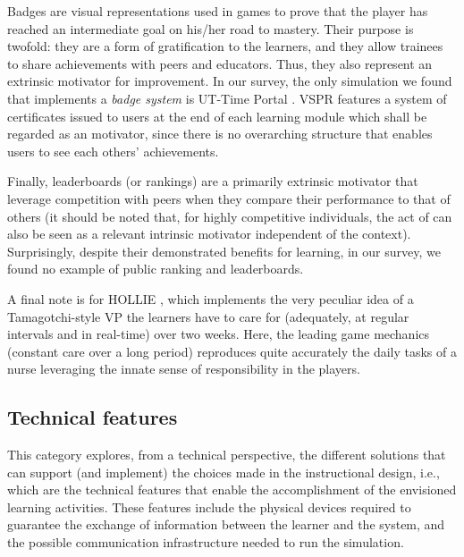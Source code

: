 Badges are visual representations used in games to prove that the player has reached an intermediate goal on his/her road to mastery. Their purpose is twofold: they are a form of gratification to the learners, and they allow trainees to share achievements with peers and educators. Thus, they also represent an extrinsic motivator for improvement.
In our survey,  the only simulation we found that implements a  \emph{badge system} is UT-Time Portal \cite{zielke2016beyond,zielke2016using}. VSPR \cite{peddle2019exploring,peddle2019development} features a system of certificates issued to users at the end of each learning module which shall be regarded as an  motivator, since there is no overarching structure that enables users to see each others' achievements.

Finally, leaderboards (or rankings) are a primarily extrinsic motivator that leverage competition with peers when they compare their performance to that of others (it should be noted that, for highly competitive individuals, the act of  can also be seen as a relevant intrinsic motivator independent of the context).
Surprisingly, despite their demonstrated benefits for learning, in our survey, we found no example of public ranking and leaderboards.

A final note is for HOLLIE \cite{adefila2020students}, which implements the very peculiar idea of a Tamagotchi-style VP the learners have to care for (adequately, at regular intervals and in real-time) over two weeks. Here, the leading game mechanics (constant care over a long period) reproduces quite accurately the daily tasks of a nurse leveraging the innate sense of responsibility in the players. 


%

\subsection{Technical features}
\label{sec:technicalDesign}

This category explores, from a technical perspective, the different solutions that can support (and implement) the choices made in the instructional design, i.e., which are the technical features that enable the accomplishment of the envisioned learning activities. These features include the physical devices required to guarantee the exchange of information between the learner and the system, and the possible communication infrastructure needed to run the simulation.

